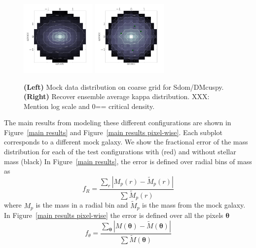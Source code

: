 \documentclass[galley,usenatbib]{mn2e}
\newcommand{\M}{\ensuremath{\mathscr{M}}}
\newcommand{\figref}[1] {Figure~\ref{#1}}
\renewcommand{\vec}[1]{\ensuremath{\boldsymbol{#1}}}
\begin{document}
\begin{figure}
\includegraphics[width=0.33\textwidth]{BCQuadR1a_TmS-kappa-a.pdf}
\includegraphics[width=0.33\textwidth]{BCQuadR1a_TmS-kappa-b.pdf}
\caption{ {\bf (Left)} Mock data distribution on coarse grid for Sdom/DMcuspy. {\bf (Right)} Recover ensemble average kappa distribution.
XXX: Mention log scale and 0== critical density.}
\label{2d mass reconstruction}
\end{figure}

The main results from modeling these different configurations are shown in
\figref{main results} and \figref{main results pixel-wise}. Each
subplot corresponds to a different mock galaxy. We show the fractional error of the mass
distribution for each of the test configurations with (red) and without stellar mass (black)
In \figref{main results}, the error is defined over radial bins of mass as
%
\begin{equation} \label{badness}
  f_R = \frac {\sum_r \left|M_p(r) - \tilde M_p(r)\right| } {\sum \tilde M_p(r)}
\end{equation}
%
where $M_p$ is the mass in a radial bin and $\tilde M_p$ is the mass from the mock galaxy.
In \figref{main results pixel-wise} the error is defined over all the pixels $\vec\theta$
%
\begin{equation} \label{badness}
f_\theta = \frac {\sum_{\vec\theta} \left|M(\vec\theta) - \tilde M(\vec\theta)\right| } {\sum \tilde M(\vec\theta)}
\end{equation}
%
\end{document}
